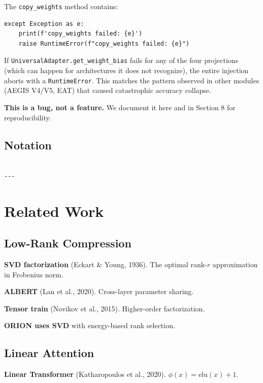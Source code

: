 The \texttt{copy\_weights} method contains:

\begin{lstlisting}
except Exception as e:
    print(f'copy_weights failed: {e}')
    raise RuntimeError(f"copy_weights failed: {e}")
\end{lstlisting}

If \texttt{UniversalAdapter.get\_weight\_bias} fails for any of the four 
projections (which can happen for architectures it does not recognize), 
the entire injection aborts with a \texttt{RuntimeError}. This matches the 
pattern observed in other modules (AEGIS V4/V5, EAT) that caused 
catastrophic accuracy collapse.

\textbf{This is a bug, not a feature.} We document it here and in Section 8 
for reproducibility.



\subsection{Notation}

\begin{lstlisting}

---
\end{lstlisting}


\section{Related Work}

\subsection{Low-Rank Compression}

\textbf{SVD factorization} (Eckart \& Young, 1936). The optimal rank-$r$ 
approximation in Frobenius norm.

\textbf{ALBERT} (Lan et al., 2020). Cross-layer parameter sharing.

\textbf{Tensor train} (Novikov et al., 2015). Higher-order factorization.

\textbf{ORION uses SVD} with energy-based rank selection.

\subsection{Linear Attention}

\textbf{Linear Transformer} (Katharopoulos et al., 2020). $\phi(x) = \text{elu}(x) + 1$.

